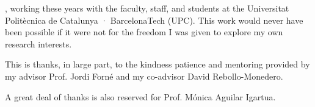 
, working these years with the faculty, staff, and students at the Universitat Politècnica de Catalunya · BarcelonaTech (UPC). This work would never have been possible if it were not for the freedom I was given to explore my own research interests.

This is thanks, in large part, to the kindness patience and mentoring provided by my advisor Prof. Jordi Forn\'e and my co-advisor David Rebollo-Monedero.

A great deal of thanks is also reserved for Prof. M\'onica Aguilar Igartua.